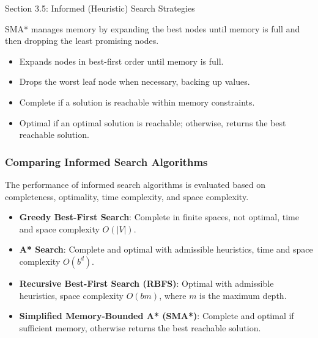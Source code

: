 \begin{notes}{Section 3.5: Informed (Heuristic) Search Strategies}
\begin{highlight}
    \end{highlight}
    
    \begin{highlight}
    
    SMA* manages memory by expanding the best nodes until memory is full and then dropping the least promising nodes.
    
    \begin{itemize}
        \item Expands nodes in best-first order until memory is full.
        \item Drops the worst leaf node when necessary, backing up values.
        \item Complete if a solution is reachable within memory constraints.
        \item Optimal if an optimal solution is reachable; otherwise, returns the best reachable solution.
    \end{itemize}
    
    \end{highlight}
    
    \subsubsection*{Comparing Informed Search Algorithms}
    
    The performance of informed search algorithms is evaluated based on completeness, optimality, time complexity, and space complexity.
    
    \begin{highlight}
    
    \begin{itemize}
        \item \textbf{Greedy Best-First Search}: Complete in finite spaces, not optimal, time and space complexity $O(|V|)$.
        \item \textbf{A* Search}: Complete and optimal with admissible heuristics, time and space complexity $O(b^d)$.
        \item \textbf{Recursive Best-First Search (RBFS)}: Optimal with admissible heuristics, space complexity $O(bm)$, where $m$ is the maximum depth.
        \item \textbf{Simplified Memory-Bounded A* (SMA*)}: Complete and optimal if sufficient memory, otherwise returns the best reachable solution.
    \end{itemize}
    

\end{highlight}
\end{notes}
